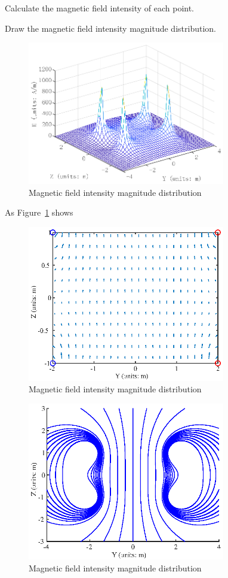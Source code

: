 \documentclass[10pt, journal, final]{IEEEtran}
\begin{document}
Calculate the magnetic field intensity of each point.


Draw the magnetic field intensity magnitude distribution.


\begin{figure}[htbp]
    \centering
    \includegraphics[width = 3.4in]{figures/work1.1.eps}
    \caption{Magnetic field intensity magnitude distribution}
    \label{fig:1.1}
\end{figure}

As Figure~\ref{fig:1.1} shows

\begin{figure}[htbp]
    \centering
    \includegraphics[width = 3.4in]{figures/work1.2.eps}
    \caption{Magnetic field intensity magnitude distribution}
    \label{fig:1.2}
\end{figure}

\begin{figure}[htbp]
    \centering
    \includegraphics[width = 3.4in]{figures/work1.3.eps}
    \caption{Magnetic field intensity magnitude distribution}
    \label{fig:1.3}
\end{figure}
\end{document}
